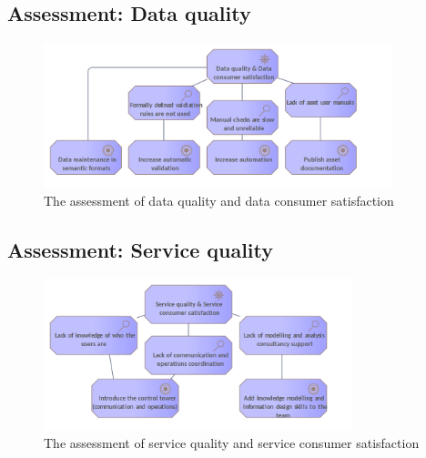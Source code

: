 	\subsection{Assessment: Data quality}

	\begin{figure}[h]
		\centering
		\includegraphics[width=0.9\textwidth]{images/motivation/Data quality.png}
		\caption{The assessment of data quality and data consumer satisfaction}
		\label{fig:data-quality}
	\end{figure}

	\subsection{Assessment: Service quality}

	\begin{figure}[h]
		\centering
		\includegraphics[width=0.8\textwidth]{images/motivation/Service quality.png}
		\caption{The assessment of service quality and service consumer satisfaction}
		\label{fig:service-quality}
	\end{figure}